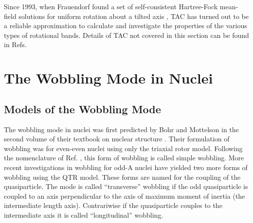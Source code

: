Since 1993, when Frauendorf found a set of self-consistent Hartree-Fock mean-field solutions for uniform rotation about a tilted axis \cite{frauendorfTiltedCranking}, TAC has turned out to be a reliable approximation to calculate and investigate the properties of the various types of rotational bands. Details of TAC not covered in this section can be found in Refs. \cite{frauendorfTiltedCranking,frauendorfChirality,frauendorfTACMultiQPBands,frauendorfTAC}

\section{The Wobbling Mode in Nuclei}
\label{sec:models-wobbling-mode}
\subsection{Models of the Wobbling Mode}
\label{ssec:models-wobbling-models}
The wobbling mode in nuclei was first predicted by Bohr and Mottelson in the second volume of their textbook on nuclear structure \cite{bohrMottelson2}. Their formulation of wobbling was for even-even nuclei using only the triaxial rotor model. Following the nomenclature of Ref. \cite{frauendorfTransverseWobbling}, this form of wobbling is called simple wobbling. More recent investigations \cite{frauendorfTransverseWobbling} in wobbling for odd-A nuclei have yielded two more forms of wobbling using the QTR model. These forms are named for the coupling of the quasiparticle. The mode is called ``transverse'' wobbling if the odd quasiparticle is coupled to an axis perpendicular to the axis of maximum moment of inertia (the intermediate length axis). Contrariwise if the quasiparticle couples to the intermediate axis it is called ``longitudinal'' wobbling.
